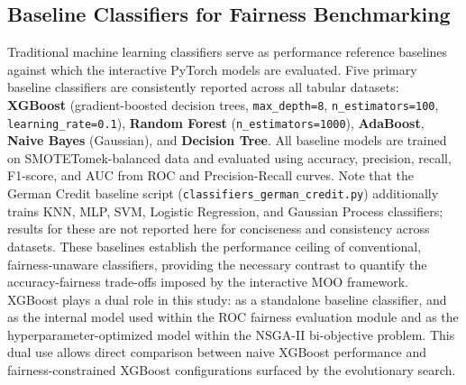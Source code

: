 \documentclass[12pt,a4paper]{article}
\begin{document}
\subsection{Baseline Classifiers for Fairness Benchmarking}
Traditional machine learning classifiers serve as performance reference baselines against which the interactive PyTorch models are evaluated. Five primary baseline classifiers are consistently reported across all tabular datasets: \textbf{XGBoost} \cite{chen2016xgboost} (gradient-boosted decision trees, \texttt{max\_depth=8}, \texttt{n\_estimators=100}, \texttt{learning\_rate=0.1}), \textbf{Random Forest} (\texttt{n\_estimators=1000}), \textbf{AdaBoost}, \textbf{Naive Bayes} (Gaussian), and \textbf{Decision Tree}. All baseline models are trained on SMOTETomek-balanced data and evaluated using accuracy, precision, recall, F1-score, and AUC from ROC and Precision-Recall curves. Note that the German Credit baseline script (\texttt{classifiers\_german\_credit.py}) additionally trains KNN, MLP, SVM, Logistic Regression, and Gaussian Process classifiers; results for these are not reported here for conciseness and consistency across datasets. These baselines establish the performance ceiling of conventional, fairness-unaware classifiers, providing the necessary contrast to quantify the accuracy-fairness trade-offs imposed by the interactive MOO framework.
XGBoost plays a dual role in this study: as a standalone baseline classifier, and as the internal model used within the ROC fairness evaluation module and as the hyperparameter-optimized model within the NSGA-II bi-objective problem. This dual use allows direct comparison between naive XGBoost performance and fairness-constrained XGBoost configurations surfaced by the evolutionary search.
\end{document}
